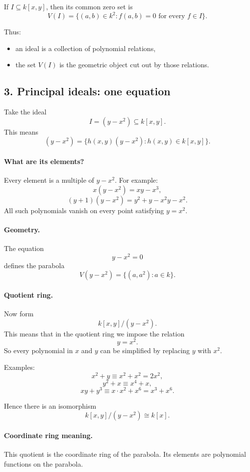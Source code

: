 \documentclass[12pt,a4paper]{article}
\theoremstyle{plain}
\theoremstyle{definition}      %
\begin{document}
	\medskip
	
	\noindent
	If \(I\subseteq k[x,y]\), then its common zero set is
	\[
	V(I)=\{(a,b)\in k^2 : f(a,b)=0 \text{ for every } f\in I\}.
	\]
	
	\medskip
	
	Thus:
	\begin{itemize}
		\item an ideal is a collection of polynomial relations,
		\item the set \(V(I)\) is the geometric object cut out by those relations.
	\end{itemize}
	
	\subsection*{3. Principal ideals: one equation}
	
	Take the ideal
	\[
	I=(y-x^2)\subseteq k[x,y].
	\]
	This means
	\[
	(y-x^2)=\{h(x,y)(y-x^2): h(x,y)\in k[x,y]\}.
	\]
	
	\paragraph{What are its elements?}
	Every element is a multiple of \(y-x^2\). For example:
	\[
	x(y-x^2)=xy-x^3,
	\]
	\[
	(y+1)(y-x^2)=y^2+y-x^2y-x^2.
	\]
	All such polynomials vanish on every point satisfying \(y=x^2\).
	
	\paragraph{Geometry.}
	The equation
	\[
	y-x^2=0
	\]
	defines the parabola
	\[
	V(y-x^2)=\{(a,a^2): a\in k\}.
	\]
	
	\paragraph{Quotient ring.}
	Now form
	\[
	k[x,y]/(y-x^2).
	\]
	This means that in the quotient ring we impose the relation
	\[
	y=x^2.
	\]
	So every polynomial in \(x\) and \(y\) can be simplified by replacing \(y\) with \(x^2\).
	
	Examples:
	\[
	x^2+y \equiv x^2+x^2=2x^2,
	\]
	\[
	y^2+x \equiv x^4+x,
	\]
	\[
	xy+y^3 \equiv x\cdot x^2 + x^6 = x^3+x^6.
	\]
	
	Hence there is an isomorphism
	\[
	k[x,y]/(y-x^2)\cong k[x].
	\]
	
	\paragraph{Coordinate ring meaning.}
	This quotient is the coordinate ring of the parabola. Its elements are polynomial functions on the parabola.
	
\end{document}

